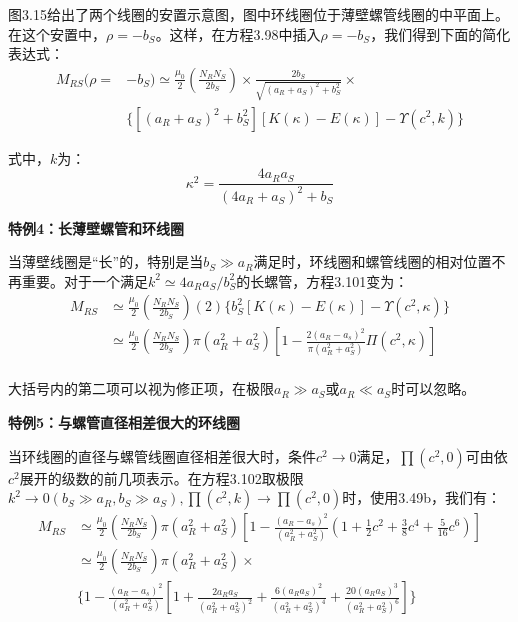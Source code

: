 图3.15给出了两个线圈的安置示意图，图中环线圈位于薄壁螺管线圈的中平面上。在这个安置中，$\rho=-b_S$。这样，在方程3.98中插入$\rho=-b_S$，我们得到下面的简化表达式：
  \begin{equation}
  \begin{split}
M_{RS}(\rho=&-b_S)\simeq\frac{\mu_0}{2}(\frac{N_R N_S}{2b_S})\times\frac{2b_S}{\sqrt{(a_R+a_S)^2+b_S^2}}\times\\
&\{[(a_R+a_S)^2+b_S^2][K(\kappa)-E(\kappa)]-\Upsilon(c^2,k)\}%
\end{split}
\end{equation}

  式中，$k$为：
  \begin{equation}
\kappa^2=\frac{4a_Ra_S}{(4a_R+a_S)^2+b_S}%
\end{equation}

\textbf{特例4：长薄壁螺管和环线圈} 

当薄壁线圈是“长”的，特别是当$b_S\gg a_R$满足时，环线圈和螺管线圈的相对位置不再重要。对于一个满足$k^2\simeq 4a_R a_S/b_S^2$的长螺管，方程3.101变为：
\begin{equation}
\begin{split}
M_{RS}&\simeq\frac{\mu_0}{2}(\frac{N_RN_S}{2b_S})(2)\{b_S^2[K(\kappa)-E(\kappa)]-\Upsilon(c^2,\kappa)\}\\
&\simeq\frac{\mu_0}{2}(\frac{N_RN_S}{2b_S})\pi(a_R^2+a_S^2)[1-\frac{2(a_R-a_s)^2}{\pi(a_R^2+a_S^2)}\Pi(c^2,\kappa)]\\%
\end{split}
\end{equation}

大括号内的第二项可以视为修正项，在极限$ a_R\gg a_S$或$a_R\ll a_S$时可以忽略。

\textbf{特例5：与螺管直径相差很大的环线圈} 

当环线圈的直径与螺管线圈直径相差很大时，条件$c^2\rightarrow 0$满足，$\prod(c^2,0)$可由依$c^2$展开的级数的前几项表示。在方程3.102取极限$k^2\rightarrow 0(b_S\gg a_R,b_S\gg a_S),\prod(c^2,k)\rightarrow \prod(c^2,0)$时，使用3.49b，我们有：
  \begin{equation}
\begin{split}
M_{RS}&\simeq\frac{\mu_0}{2}(\frac{N_RN_S}{2b_S})\pi(a_R^2+a_S^2)[1-\frac{(a_R-a_s)^2}{(a_R^2+a_S^2)}(1+\frac{1}{2}c^2+\frac{3}{8}c^4+\frac{5}{16}c^6)]\\
&\simeq\frac{\mu_0}{2}(\frac{N_RN_S}{2b_S})\pi(a_R^2+a_S^2)\times \\
&\{1-\frac{(a_R-a_s)^2}{(a_R^2+a_S^2)}[1+\frac{2a_Ra_S}{(a_R^2+a_S^2)^2}+\frac{6(a_Ra_S)^2}{(a_R^2+a_S^2)^4}+\frac{20(a_Ra_S)^3}{(a_R^2+a_S^2)^6}]\}%
\end{split}
\end{equation}

